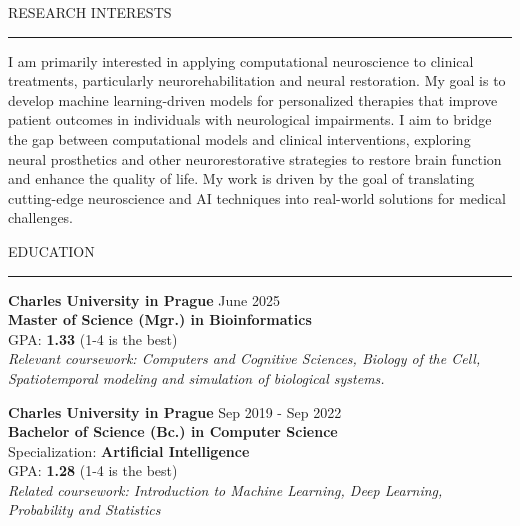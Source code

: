 \documentclass{resume} %
\renewenvironment{rSection}[1]{
\sectionskip
\textcolor{CarnegieMellonRed}{\MakeUppercase{#1}}
\sectionlineskip
\hrule
\begin{list}{}{
\setlength{\leftmargin}{1.5em}
}
\item[]
}{
\end{list}
}
\begin{document}
\begin{rSection}{Research Interests}
    I am primarily interested in applying computational neuroscience to clinical treatments, 
    particularly neurorehabilitation and neural restoration. My goal is to develop machine 
    learning-driven models for personalized therapies that improve patient outcomes in 
    individuals with neurological impairments. I aim to bridge the gap between computational 
    models and clinical interventions, exploring neural prosthetics and other neurorestorative 
    strategies to restore brain function and enhance the quality of life.
    My work is driven by the goal of translating cutting-edge neuroscience and 
    AI techniques into real-world solutions for medical challenges.
\end{rSection}

\begin{rSection}{Education}
{\bf \large Charles University in Prague} \hfill {June 2025} 
\\ {\bf Master of Science (Mgr.) in Bioinformatics} \hfill
\\ GPA: \textbf{1.33} (1-4 \vline {} is the best)  \hfill
\\ \textit{Relevant coursework: Computers and Cognitive Sciences, Biology of the Cell, 
Spatiotemporal modeling and simulation of biological systems.
}

{\bf \large Charles University in Prague} \hfill {Sep 2019 - Sep 2022} 
\\ {\bf Bachelor of Science (Bc.) in Computer Science} \hfill
\\ Specialization: \textbf{Artificial Intelligence} \hfill
\\ GPA: \textbf{1.28} (1-4 \vline {} is the best)  \hfill
\\ \textit{Related coursework: Introduction to Machine Learning, Deep Learning, 
Probability and Statistics
}

\end{rSection}
\end{document}
